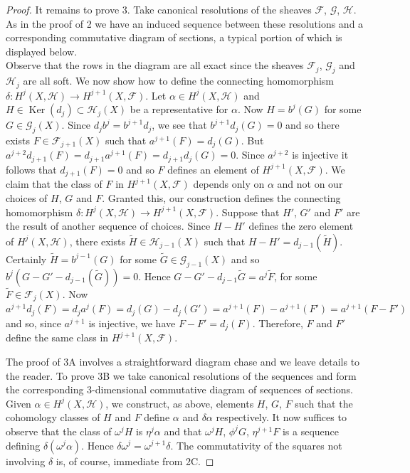 \begin{proof}
It remains to prove 3. Take canonical resolutions of the sheaves $\mathcal F$, $\mathcal G$, $\mathcal H$. As in the proof of 2 we have an induced sequence between these resolutions and a corresponding commutative diagram of sections, a typical portion of which is displayed below.
\[

\]
Observe that the rows in the diagram are all exact since the sheaves $\mathcal F_j$, $\mathcal G_j$ and $\mathcal H_j$ are all soft. We now show how to define the connecting homomorphism $\delta:H^j(X,\mathcal H)\to H^{j+1}(X,\mathcal F)$. Let $\alpha\in H^j(X,\mathcal H)$ and $H\in\operatorname{Ker}(d_j)\subset\mathcal H_j(X)$ be a representative for $\alpha$. Now $H=b^j(G)$ for some $G\in\mathcal G_j(X)$. Since $d_jb^j=b^{j+1}d_j$, we see that $b^{j+1}d_j(G)=0$ and so there exists $F\in\mathcal F_{j+1}(X)$ such that $a^{j+1}(F)=d_j(G)$. But $a^{j+2}d_{j+1}(F)=d_{j+1}a^{j+1}(F)=d_{j+1}d_j(G)=0$. Since $a^{j+2}$ is injective it follows that $d_{j+1}(F)=0$ and so $F$ defines an element of $H^{j+1}(X,\mathcal F)$. We claim that the class of $F$ in $H^{j+1}(X,\mathcal F)$ depends only on $\alpha$ and not on our choices of $H$, $G$ and $F$. Granted this, our construction defines the connecting homomorphism $\delta:H^j(X,\mathcal H)\to H^{j+1}(X,\mathcal F)$. Suppose that $H'$, $G'$ and $F'$ are the result of another sequence of choices. Since $H-H'$ defines the zero element of $H^j(X,\mathcal H)$, there exists $\widetilde H\in\mathcal H_{j-1}(X)$ such that $H-H'=d_{j-1}(\widetilde H)$. Certainly $\widetilde H=b^{j-1}(G)$ for some $\widetilde G\in\mathcal G_{j-1}(X)$ and so $b^j(G-G'-d_{j-1}(\widetilde G))=0$. Hence $G-G'-d_{j-1}\widetilde G=a^j\widetilde F$, for some $\widetilde F\in\mathcal F_j(X)$.
Now $a^{j+1}d_j(F)=d_ja^j(F)=d_j(G)-d_j(G')=a^{j+1}(F)-a^{j+1}(F')=a^{j+1}(F-F')$ and so, since $a^{j+1}$ is injective, we have $F-F'=d_j(F)$. Therefore, $F$ and $F'$ define the same class in $H^{j+1}(X,\mathcal F)$.

The proof of 3A involves a straightforward diagram chase and we leave details to the reader. To prove 3B we take canonical resolutions of the sequences and form the corresponding 3-dimensional commutative diagram of sequences of sections. Given $\alpha\in H^j(X,\mathcal H)$, we construct, as above, elements $H$, $G$, $F$ such that the cohomology classes of $H$ and $F$ define $\alpha$ and $\delta\alpha$ respectively. It now suffices to observe that the class of $\omega^jH$ is $\eta^j\alpha$ and that $\omega^jH$, $\phi^jG$, $\eta^{j+1}F$ is a sequence defining $\delta(\omega^j\alpha)$. Hence $\delta\omega^j=\omega^{j+1}\delta$. The commutativity of the squares not involving $\delta$ is, of course, immediate from 2C.
\end{proof}
